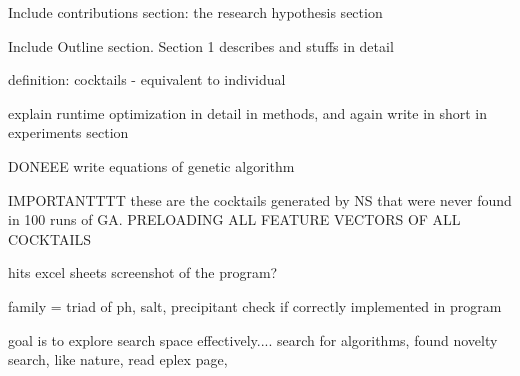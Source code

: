 Include contributions section:
    the research hypothesis section
    
    


Include Outline section. Section 1 describes and stuffs in detail


definition:
cocktails - equivalent to individual


explain runtime optimization in detail in methods, and again write in short in experiments section


DONEEE write equations of genetic algorithm



IMPORTANTTTT these are the cocktails generated by NS that were never found in 100 runs of GA.
PRELOADING ALL FEATURE VECTORS OF ALL COCKTAILS



hits excel sheets
screenshot of the program?

family = triad of ph, salt, precipitant
check if correctly implemented in program




goal is to explore search space effectively.... search for algorithms, found novelty search, like nature, read eplex page, 